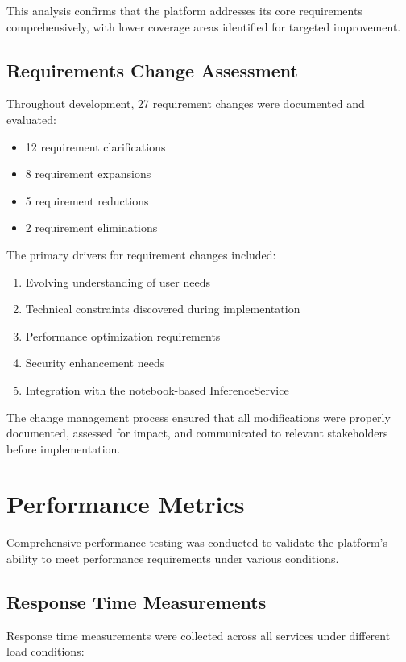 This analysis confirms that the platform addresses its core requirements comprehensively, with lower coverage areas identified for targeted improvement.

\subsection{Requirements Change Assessment}

Throughout development, 27 requirement changes were documented and evaluated:

\begin{itemize}
    \item 12 requirement clarifications
    \item 8 requirement expansions
    \item 5 requirement reductions
    \item 2 requirement eliminations
\end{itemize}

The primary drivers for requirement changes included:

\begin{enumerate}
    \item Evolving understanding of user needs
    \item Technical constraints discovered during implementation
    \item Performance optimization requirements
    \item Security enhancement needs
    \item Integration with the notebook-based InferenceService
\end{enumerate}

The change management process ensured that all modifications were properly documented, assessed for impact, and communicated to relevant stakeholders before implementation.

\section{Performance Metrics}

Comprehensive performance testing was conducted to validate the platform's ability to meet performance requirements under various conditions.

\subsection{Response Time Measurements}

Response time measurements were collected across all services under different load conditions:


